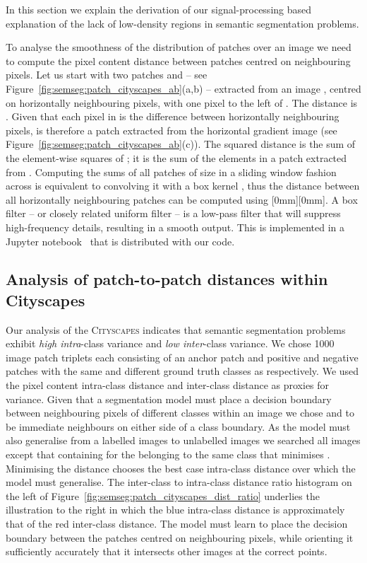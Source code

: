 \documentclass{bmvc2k}
\newcommand{\Cityscapes}{\textsc{Cityscapes}}
\begin{document}
In this section we explain the derivation of our signal-processing based explanation of the lack of low-density regions in semantic segmentation problems.

To analyse the smoothness of the distribution of patches over an image we need to compute the  pixel content distance between patches centred on neighbouring pixels.
Let us start with two patches  and  -- see Figure~\ref{fig:semseg:patch_cityscapes_ab}(a,b) -- extracted from an image , centred on horizontally neighbouring pixels, with  one pixel to the left of .
The  distance is .
Given that each pixel in  is the difference between horizontally neighbouring pixels,  is therefore a patch extracted from the horizontal gradient
image  (see Figure~\ref{fig:semseg:patch_cityscapes_ab}(c)).
The squared distance is the sum of the element-wise squares of ; it is the sum of the elements in a patch extracted from .
Computing the sums of all patches of size  in a sliding window fashion across  is equivalent to convolving it with a box kernel , thus the
distance between all horizontally neighbouring patches can be computed using \raisebox{0mm}[0mm][0mm]{}.
A box filter -- or closely related uniform filter -- is a low-pass filter that will suppress high-frequency details, resulting in a smooth output.
This is implemented in a Jupyter notebook~\cite{Kluyver:JupyterNotebook} that is distributed with our code.


\subsection{Analysis of patch-to-patch distances within Cityscapes}


Our analysis of the \Cityscapes{} indicates that semantic segmentation problems exhibit \emph{high intra}-class variance and \emph{low inter}-class variance.
We chose 1000 image patch triplets each consisting of an anchor patch  and positive  and negative  patches with the same and different ground truth classes as  respectively.
We used the  pixel content intra-class distance  and inter-class distance  as proxies for variance.
Given that a segmentation model must place a decision boundary between neighbouring pixels of different classes within an image we chose  and  to be immediate neighbours on either side of a class boundary.
As the model must also generalise from a labelled images to unlabelled images we searched all images except that containing  for the  belonging to the same class that minimises . Minimising the distance
chooses the best case intra-class distance over which the model must generalise.
The inter-class to intra-class distance ratio histogram on the left of Figure~\ref{fig:semseg:patch_cityscapes_dist_ratio} underlies the illustration to the right in which the blue intra-class distance is approximately 
that of the red inter-class distance. The model must learn to place the decision boundary between the patches centred on neighbouring pixels, while orienting it sufficiently accurately that it intersects other images at the correct
points.
\end{document}
